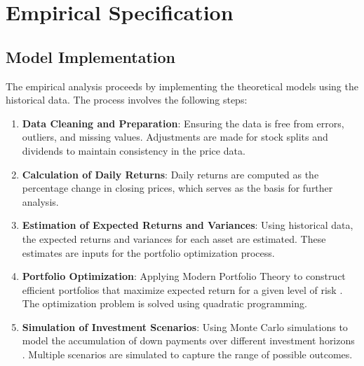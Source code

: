 \section{Empirical Specification}
\subsection{Model Implementation}
The empirical analysis proceeds by implementing the theoretical models using the historical data. The process involves the following steps:
\begin{enumerate}
    \item \textbf{Data Cleaning and Preparation}: Ensuring the data is free from errors, outliers, and missing values. Adjustments are made for stock splits and dividends to maintain consistency in the price data.
    \item \textbf{Calculation of Daily Returns}: Daily returns are computed as the percentage change in closing prices, which serves as the basis for further analysis.
    \item \textbf{Estimation of Expected Returns and Variances}: Using historical data, the expected returns and variances for each asset are estimated. These estimates are inputs for the portfolio optimization process.
    \item \textbf{Portfolio Optimization}: Applying Modern Portfolio Theory to construct efficient portfolios that maximize expected return for a given level of risk \citep{markowitz1952portfolio}. The optimization problem is solved using quadratic programming.
    \item \textbf{Simulation of Investment Scenarios}: Using Monte Carlo simulations to model the accumulation of down payments over different investment horizons \citep{boyle1977options}. Multiple scenarios are simulated to capture the range of possible outcomes.
\end{enumerate}

